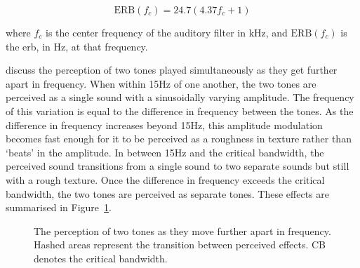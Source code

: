 		\begin{equation}
			\mathrm{ERB}(f_{c}) = 24.7(4.37f_{c} + 1)
			\label{eq:ERB}
		\end{equation}

		where $f_{c}$ is the center frequency of the auditory filter in kHz, and $\mathrm{ERB}(f_{c})$ is the
		\acrshort{erb}, in Hz, at that frequency.

		\citet{howard2009acoustics} discuss the perception of two tones played simultaneously as they get further
		apart in frequency. When within 15Hz of one another, the two tones are perceived as a single sound with a
		sinusoidally varying amplitude. The frequency of this variation is equal to the difference in frequency
		between the tones. As the difference in frequency increases beyond 15Hz, this amplitude modulation becomes
		fast enough for it to be perceived as a roughness in texture rather than `beats' in the amplitude. In
		between 15Hz and the critical bandwidth, the perceived sound transitions from a single sound to two
		separate sounds but still with a rough texture. Once the difference in frequency exceeds the critical
		bandwidth, the two tones are perceived as separate tones. These effects are summarised in
		Figure~\ref{fig:ToneSeparation}.

		\begin{figure}[h!]
			\centering
			\caption{The perception of two tones as they move further apart in frequency. Hashed areas
				 represent the transition between perceived effects. CB denotes the critical bandwidth.}
			\label{fig:ToneSeparation}
		\end{figure}

